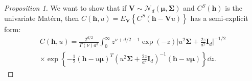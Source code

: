 \documentclass[12pt]{article}
\newcommand{\0}{\mathbf{0}}
\newtheorem{proof}{Proof}
\begin{document}
\begin{proof}[Proposition 1]
We want to show that if $\mathbf{V}\sim\mathcal{N}_d\left(\boldsymbol{\mu},\boldsymbol{\Sigma}\right)$ and $C^S(\mathbf{h})$ is the univariate Mat\'{e}rn, then $C(\mathbf{h},u)=E_{\mathbf{V}}\left\{C^S(\mathbf{h-V}u)\right\}$ has a semi-explicit form:
\begin{multline*}
C(\mathbf{h},u)=\frac{2^{d/2}}{ \Gamma(\nu)a^{d}} \int_0^{\infty}z^{\nu+d/2-1} \exp\left(-z\right)\Big|u^2\boldsymbol{\Sigma}+\frac{2z}{a^2}\mathbf{I}_{d}\Big|^{-1/2}\\
\times \exp\left\{-\frac{1}{2}(\mathbf{h}-u\boldsymbol{\mu})^T\left(u^2\boldsymbol{\Sigma}+\frac{2z}{a^2}\mathbf{I}_{d}\right)^{-1}(\mathbf{h}-u\boldsymbol{\mu})\right\}\dd z. 
\end{multline*}

\begingroup
\allowdisplaybreaks


\end{proof}
\end{document}
